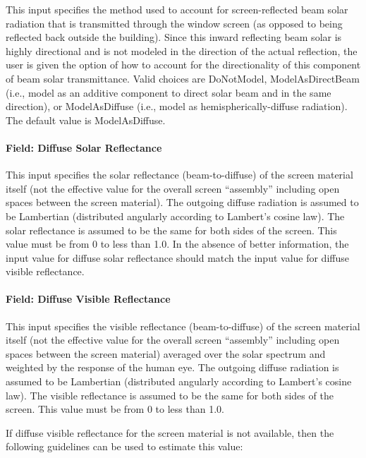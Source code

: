 This input specifies the method used to account for screen-reflected beam solar radiation that is transmitted through the window screen (as opposed to being reflected back outside the building). Since this inward reflecting beam solar is highly directional and is not modeled in the direction of the actual reflection, the user is given the option of how to account for the directionality of this component of beam solar transmittance. Valid choices are DoNotModel, ModelAsDirectBeam (i.e., model as an additive component to direct solar beam and in the same direction), or ModelAsDiffuse (i.e., model as hemispherically-diffuse radiation). The default value is ModelAsDiffuse.

\paragraph{Field: Diffuse Solar Reflectance}\label{field-diffuse-solar-reflectance}

This input specifies the solar reflectance (beam-to-diffuse) of the screen material itself (not the effective value for the overall screen ``assembly'' including open spaces between the screen material). The outgoing diffuse radiation is assumed to be Lambertian (distributed angularly according to Lambert's cosine law). The solar reflectance is assumed to be the same for both sides of the screen. This value must be from 0 to less than 1.0. In the absence of better information, the input value for diffuse solar reflectance should match the input value for diffuse visible reflectance.

\paragraph{Field: Diffuse Visible Reflectance}\label{field-diffuse-visible-reflectance}

This input specifies the visible reflectance (beam-to-diffuse) of the screen material itself (not the effective value for the overall screen ``assembly'' including open spaces between the screen material) averaged over the solar spectrum and weighted by the response of the human eye. The outgoing diffuse radiation is assumed to be Lambertian (distributed angularly according to Lambert's cosine law). The visible reflectance is assumed to be the same for both sides of the screen. This value must be from 0 to less than 1.0.

If diffuse visible reflectance for the screen material is not available, then the following guidelines can be used to estimate this value:

